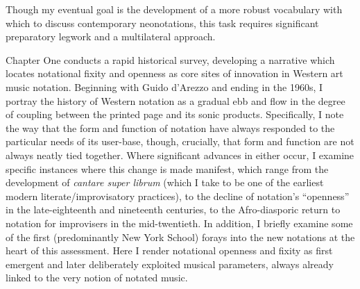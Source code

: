 Though my eventual goal is the development of a more robust vocabulary with which to discuss contemporary neonotations, this task requires significant preparatory legwork and a multilateral approach.

Chapter One conducts a rapid historical survey, developing a narrative which locates notational fixity and openness as core sites of innovation in Western art music notation. 
Beginning with Guido d'Arezzo and ending in the 1960s, I portray the history of Western notation as a gradual ebb and flow in the degree of coupling between the printed page and its sonic products. 
Specifically, I note the way that the form and function of notation have always responded to the particular needs of its user-base, though, crucially, that form and function are not always neatly tied together.
Where significant advances in either occur, I examine specific instances where this change is made manifest, which range from the development of \textit{cantare super librum} (which I take to be one of the earliest modern literate/improvisatory practices), to the decline of notation's ``openness'' in the late-eighteenth and nineteenth centuries, to the Afro-diasporic return to notation for improvisers in the mid-twentieth.
In addition, I briefly examine some of the first (predominantly New York School) forays into the new notations at the heart of this assessment. 
Here I render notational openness and fixity as first emergent and later deliberately exploited musical parameters, always already linked to the very notion of notated music.

